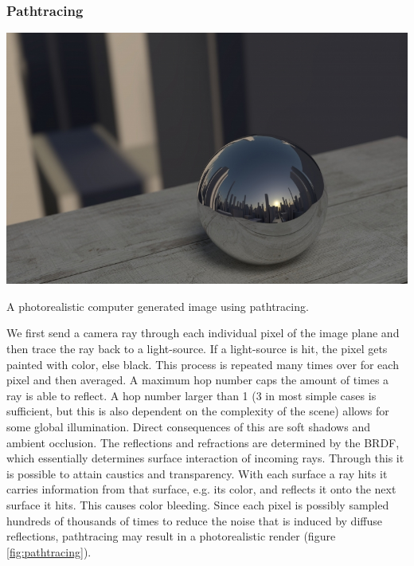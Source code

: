 \documentclass{ACGSeminar}
\begin{document}
	\subsubsection{Pathtracing} 
		\begin{floatingfigure}[r]{.6\textwidth}%
				\includegraphics[width=.6\textwidth]{img/pathtracing.png}
				\caption{A photorealistic computer generated image using pathtracing.}%
				\label{fig:pathtracing}%
		\end{floatingfigure}%
		We first send a camera ray through each individual pixel of the image plane and then trace the ray back to a light-source. If a light-source is hit, the pixel gets painted with color, else black. This process is repeated many times over for each pixel and then averaged. A maximum hop number caps the amount of times a ray is able to reflect. A hop number larger than 1 (3 in most simple cases is sufficient, but this is also dependent on the complexity of the scene) allows for some global illumination. Direct consequences of this are soft shadows and ambient occlusion. The reflections and refractions are determined by the BRDF, which essentially determines surface interaction of incoming rays. Through this it is possible to attain caustics and transparency. With each surface a ray hits it carries information from that surface, e.g. its color, and reflects it onto the next surface it hits. This causes color bleeding. Since each pixel is possibly sampled hundreds of thousands of times to reduce the noise that is induced by diffuse reflections, pathtracing may result in a photorealistic render (figure \ref{fig:pathtracing}).
\end{document}
